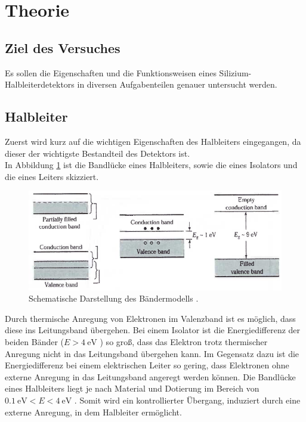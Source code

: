 \section{Theorie}
\label{sec:Theorie}
\subsection{Ziel des Versuches}
Es sollen die Eigenschaften und die Funktionsweisen eines Silizium-Halbleiterdetektors
in diversen Aufgabenteilen genauer untersucht werden.

\subsection{Halbleiter}

Zuerst wird kurz auf die wichtigen Eigenschaften des Halbleiters eingegangen, da dieser
der wichtigste Bestandteil des Detektors ist. \\
In Abbildung \ref{bänder} ist die Bandlücke eines Halbleiters, sowie die eines Isolators und die eines Leiters skizziert. 

\begin{figure}[H]
  \centering
  \includegraphics[width=1\textwidth]{ressources/bandgap.png}
  \caption{Schematische Darstellung des Bändermodells \cite{SZE}.}
  \label{bänder}
\end{figure}

Durch thermische Anregung von Elektronen im Valenzband ist es möglich, dass diese ins Leitungsband übergehen. Bei einem Isolator ist die Energiedifferenz der beiden Bänder ($E>\SI{4}{\electronvolt}$ \cite{SZE}) so groß, dass das Elektron trotz thermischer Anregung nicht in das Leitungsband übergehen kann. Im Gegensatz dazu ist die Energiedifferenz bei einem elektrischen Leiter so gering, dass Elektronen ohne externe Anregung in das Leitungsband angeregt werden können. Die Bandlücke eines Halbleiters liegt je nach Material und Dotierung im Bereich von $\SI{0,1}{\electronvolt}<E<\SI{4}{\electronvolt}$ \cite{SZE}. Somit wird ein kontrollierter Übergang, induziert durch eine externe Anregung, in dem Halbleiter ermöglicht.

